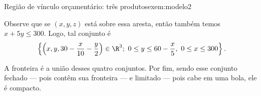 \begin{example}{Região de vínculo orçamentário: três produtos}{exem:modelo2}
\begin{center}
\end{center}

Observe que se $(x,y,z)$ está sobre essa aresta, então também temos  $x+5y\leq 300$. Logo, tal conjunto é 
$$\left\{ \left(x,y,30 - \frac{x}{10} -\frac{y}{2}\right)\in\R^3;~0\leq y \leq 60-\frac{x}{5},~0\leq x \leq 300 \right\}.$$

A fronteira é a união desses quatro conjuntos. Por fim, sendo esse conjunto fechado --- pois contêm sua fronteira --- e limitado --- pois cabe em uma bola, ele é compacto. 
\end{example}


